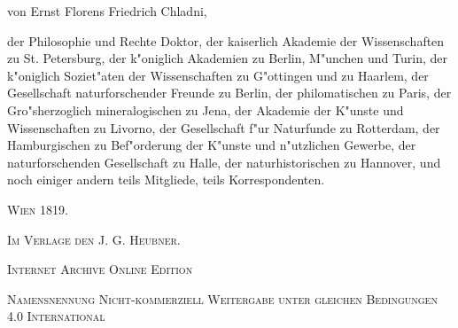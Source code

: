 \documentclass[a4paper, 11pt, oneside, polutonikogreek, german]{article}
\begin{document}
\begin{titlepage}
	{\large von Ernst Florens Friedrich Chladni,} %
	
	\vspace*{1\baselineskip} %
	
    {\normalsize der Philosophie und Rechte Doktor, der kaiserlich Akademie der Wissenschaften zu St. Petersburg, der k"oniglich Akademien zu Berlin, M"unchen und Turin, der k"oniglich Soziet"aten der Wissenschaften zu G"ottingen und zu Haarlem, der Gesellschaft naturforschender Freunde zu Berlin, der philomatischen zu Paris, der Gro"sherzoglich mineralogischen zu Jena, der Akademie der K"unste und Wissenschaften zu Livorno, der Gesellschaft f"ur Naturfunde zu Rotterdam, der Hamburgischen zu Bef"orderung der K"unste und n"utzlichen Gewerbe, der naturforschenden Gesellschaft zu Halle, der naturhistorischen zu Hannover, und noch einiger andern teils Mitgliede, teils Korrespondenten.} %
    
    \vspace*{\fill}

	\vspace{1\baselineskip}

	{\small\scshape Wien 1819.}
	
	{\small\scshape{Im Verlage den J. G. Heubner.}}
	
	\vspace{0.5\baselineskip} %

    \scshape Internet Archive Online Edition  %
	
	{\scshape\small Namensnennung Nicht-kommerziell Weitergabe unter gleichen Bedingungen 4.0 International} %
\end{titlepage}
\setlength{\parskip}{1mm plus1mm minus1mm}
\clearpage
\tableofcontents
\clearpage
\LARGE
\pagestyle{fancy}
\fancyhf{}
\cfoot{\swabfamily{\thepage}}
\section*{}
\end{document}
